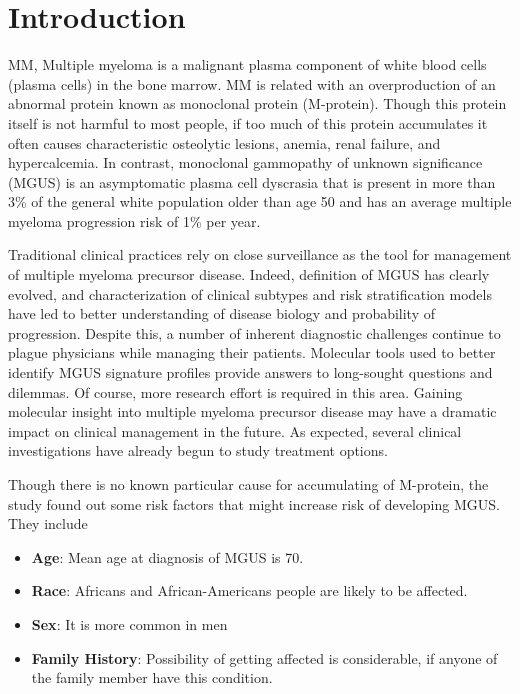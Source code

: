 \documentclass[conference]{IEEEtran}
\begin{document}
\section{Introduction}
\par MM, Multiple myeloma is a malignant plasma component of white blood cells (plasma cells) in the bone marrow. MM is related with an overproduction of an abnormal protein known as monoclonal protein (M-protein). Though this protein itself is not harmful to most people, if too much of this protein accumulates it often causes characteristic osteolytic lesions, anemia, renal failure, and hypercalcemia. \cite{monoclonal8} In contrast, monoclonal gammopathy of unknown significance (MGUS) is an asymptomatic plasma cell dyscrasia that is present in more than 3\% of the general white population older than age 50 and has an average multiple myeloma progression risk of 1\% per year. \cite{monoclonal9} \par

Traditional clinical practices rely on close surveillance as the tool for management of multiple myeloma precursor disease. Indeed, definition of MGUS has clearly evolved, and characterization of clinical subtypes and risk stratification models have led to better understanding of disease biology and probability of progression. Despite this, a number of inherent diagnostic challenges continue to plague physicians while managing their patients. Molecular tools used to better identify MGUS signature profiles provide answers to long-sought questions and dilemmas. Of course, more research effort is required in this area. Gaining molecular insight into multiple myeloma precursor disease may have a dramatic impact on clinical management in the future. As expected, several clinical investigations have already begun to study treatment options. \par

Though there is no known particular cause for accumulating of M-protein, the study found out some risk factors that might increase risk of developing MGUS. They include

\begin{itemize}
  \item \textbf{Age}: Mean age at diagnosis of MGUS is 70.
  \item \textbf{Race}: Africans and African-Americans people are likely to be affected.
  \item \textbf{Sex}: It is more common in men
  \item \textbf{Family History}: Possibility of getting affected is considerable, if anyone of the family member have this condition.
\end{itemize}
\end{document}
